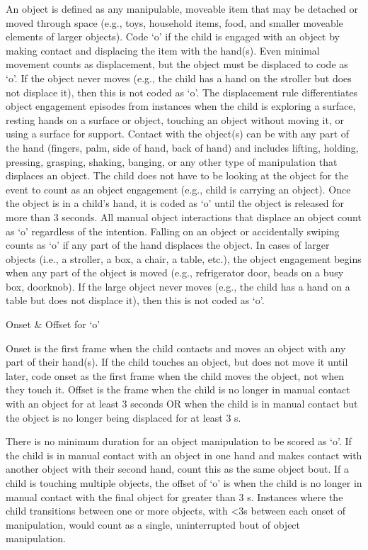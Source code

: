 \documentclass[
]{book}
\begin{document}
An object is defined as any manipulable, moveable item that may be detached or moved through space (e.g., toys, household items, food, and smaller moveable elements of larger objects). Code `o' if the child is engaged with an object by making contact and displacing the item with the hand(s). Even minimal movement counts as displacement, but the object must be displaced to code as `o'. If the object never moves (e.g., the child has a hand on the stroller but does not displace it), then this is not coded as `o'. The displacement rule differentiates object engagement episodes from instances when the child is exploring a surface, resting hands on a surface or object, touching an object without moving it, or using a surface for support.
Contact with the object(s) can be with any part of the hand (fingers, palm, side of hand, back of hand) and includes lifting, holding, pressing, grasping, shaking, banging, or any other type of manipulation that displaces an object. The child does not have to be looking at the object for the event to count as an object engagement (e.g., child is carrying an object). Once the object is in a child's hand, it is coded as `o' until the object is released for more than 3 seconds. All manual object interactions that displace an object count as `o' regardless of the intention. Falling on an object or accidentally swiping counts as `o' if any part of the hand displaces the object.
In cases of larger objects (i.e., a stroller, a box, a chair, a table, etc.), the object engagement begins when any part of the object is moved (e.g., refrigerator door, beads on a busy box, doorknob). If the large object never moves (e.g., the child has a hand on a table but does not displace it), then this is not coded as `o'.

Onset \& Offset for `o'

Onset is the first frame when the child contacts and moves an object with any part of their hand(s). If the child touches an object, but does not move it until later, code onset as the first frame when the child moves the object, not when they touch it.
Offset is the frame when the child is no longer in manual contact with an object for at least 3 seconds OR when the child is in manual contact but the object is no longer being displaced for at least 3 s.

There is no minimum duration for an object manipulation to be scored as `o'. If the child is in manual contact with an object in one hand and makes contact with another object with their second hand, count this as the same object bout. If a child is touching multiple objects, the offset of `o' is when the child is no longer in manual contact with the final object for greater than 3 s. Instances where the child transitions between one or more objects, with \textless3s between each onset of manipulation, would count as a single, uninterrupted bout of object manipulation.
\end{document}
